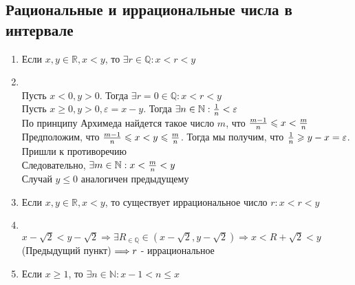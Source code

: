 \documentclass[12pt,letterpaper]{report}
\makeatletter
\theoremstyle{definition}
\newcommand{\Q}{\mathbb{Q}}
\renewenvironment{proof}[1][\proofname]{%
   \par\pushQED{\qed}\normalfont%
   \topsep6\p@\@plus6\p@\relax
   \trivlist\item[\hskip\labelsep\bfseries#1\@addpunct{.}]%
   \ignorespaces
}{%
   \popQED\endtrivlist\@endpefalse
}
\makeatother
\begin{document}
\subsection*{Рациональные и иррациональные числа в интервале}
\begin{enumerate}
    \item Если $x, y \in \mathbb{R}, x < y$, то $\exists r \in \mathbb{Q}: x < r < y$ 
    \begin{proof}
        \quad \\ Пусть $x < 0, y > 0$. Тогда $\exists r = 0 \in \mathbb{Q}: x < r < y$ \\
        Пусть $x \geqslant 0, y > 0, \varepsilon = x - y$. Тогда $\exists n \in \mathbb{N}: {{1}\over{n}} < \varepsilon$ \\
        По принципу Архимеда найдется такое число $m$, что ${{m-1}\over{n}} \leqslant x < {{m}\over{n}}$ \vspace{0.2cm} \\
        Предположим, что ${{m-1}\over{n}} \leqslant x < y \leqslant {{m}\over{n}}$. Тогда мы получим, что ${{1}\over{n}} \geqslant y - x = \varepsilon$.
        Пришли к противоречию\\
        Следовательно, $\exists m \in \mathbb{N} : x < {{m}\over{n}} < y$ \\
        Случай $y \leqslant 0$ аналогичен предыдущему
    \end{proof} 
    \item Если $x, y \in \mathbb{R}, x < y$, то существует иррациональное число $r: x < r < y$ 
    \begin{proof}
        \quad \\ $x - \sqrt{2} < y - \sqrt{2} \Longrightarrow \exists R_{\in \Q} \in (x - \sqrt{2}, y - \sqrt{2}) \Longrightarrow
        x < R + \sqrt{2} < y \; $(Предыдущий пункт)$ \; \Longrightarrow \\ r$ - иррациональное
    \end{proof} 
    \item Если $x \geqslant 1$, то $\exists n \in \mathbb{N}: x - 1 < n \leqslant x$ 
\end{enumerate}
\end{document}
